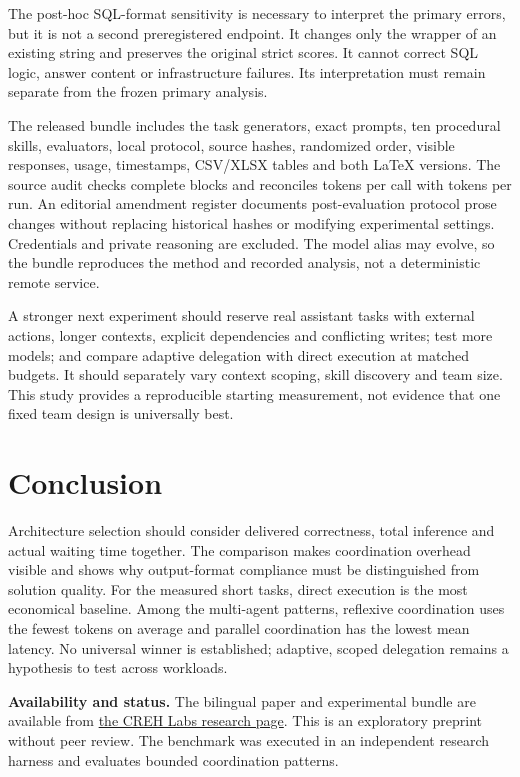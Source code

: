 The post-hoc SQL-format sensitivity is necessary to interpret the primary errors, but it is not a second preregistered endpoint. It changes only the wrapper of an existing string and preserves the original strict scores. It cannot correct SQL logic, answer content or infrastructure failures. Its interpretation must remain separate from the frozen primary analysis.

The released bundle includes the task generators, exact prompts, ten procedural skills, evaluators, local protocol, source hashes, randomized order, visible responses, usage, timestamps, CSV/XLSX tables and both LaTeX versions. The source audit checks complete blocks and reconciles tokens per call with tokens per run. An editorial amendment register documents post-evaluation protocol prose changes without replacing historical hashes or modifying experimental settings. Credentials and private reasoning are excluded. The model alias may evolve, so the bundle reproduces the method and recorded analysis, not a deterministic remote service.

A stronger next experiment should reserve real assistant tasks with external actions, longer contexts, explicit dependencies and conflicting writes; test more models; and compare adaptive delegation with direct execution at matched budgets. It should separately vary context scoping, skill discovery and team size. This study provides a reproducible starting measurement, not evidence that one fixed team design is universally best.

\section{Conclusion}
Architecture selection should consider delivered correctness, total inference and actual waiting time together. The comparison makes coordination overhead visible and shows why output-format compliance must be distinguished from solution quality. For the measured short tasks, direct execution is the most economical baseline. Among the multi-agent patterns, reflexive coordination uses the fewest tokens on average and parallel coordination has the lowest mean latency. No universal winner is established; adaptive, scoped delegation remains a hypothesis to test across workloads.

\smallskip
\textbf{Availability and status.} The bilingual paper and experimental bundle are available from \href{https://crehlabs.com/en/research/subagentes-arquitecturas-tokens-tiempo-2026/}{the CREH Labs research page}. This is an exploratory preprint without peer review. The benchmark was executed in an independent research harness and evaluates bounded coordination patterns.
